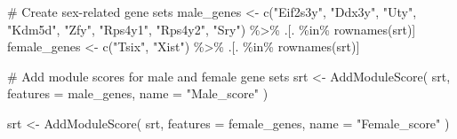 \documentclass[
  letterpaper,
  DIV=11,
  numbers=noendperiod]{scrartcl}
\newenvironment{Shaded}{\begin{snugshade}}{\end{snugshade}}
\newcommand{\AttributeTok}[1]{\textcolor[rgb]{0.40,0.45,0.13}{#1}}
\newcommand{\CommentTok}[1]{\textcolor[rgb]{0.37,0.37,0.37}{#1}}
\newcommand{\ConstantTok}[1]{\textcolor[rgb]{0.56,0.35,0.01}{#1}}
\newcommand{\DecValTok}[1]{\textcolor[rgb]{0.68,0.00,0.00}{#1}}
\newcommand{\FloatTok}[1]{\textcolor[rgb]{0.68,0.00,0.00}{#1}}
\newcommand{\FunctionTok}[1]{\textcolor[rgb]{0.28,0.35,0.67}{#1}}
\newcommand{\NormalTok}[1]{\textcolor[rgb]{0.00,0.23,0.31}{#1}}
\newcommand{\OtherTok}[1]{\textcolor[rgb]{0.00,0.23,0.31}{#1}}
\newcommand{\SpecialCharTok}[1]{\textcolor[rgb]{0.37,0.37,0.37}{#1}}
\newcommand{\StringTok}[1]{\textcolor[rgb]{0.13,0.47,0.30}{#1}}
\begin{document}
\begin{Shaded}
\begin{Highlighting}[]
\CommentTok{\# Create sex{-}related gene sets}
\NormalTok{male\_genes }\OtherTok{\textless{}{-}} \FunctionTok{c}\NormalTok{(}\StringTok{"Eif2s3y"}\NormalTok{, }\StringTok{"Ddx3y"}\NormalTok{, }\StringTok{"Uty"}\NormalTok{, }\StringTok{"Kdm5d"}\NormalTok{, }\StringTok{"Zfy"}\NormalTok{, }\StringTok{"Rps4y1"}\NormalTok{, }\StringTok{"Rps4y2"}\NormalTok{, }\StringTok{"Sry"}\NormalTok{) }\SpecialCharTok{\%\textgreater{}\%}\NormalTok{ .[. }\SpecialCharTok{\%in\%} \FunctionTok{rownames}\NormalTok{(srt)]}
\NormalTok{female\_genes }\OtherTok{\textless{}{-}} \FunctionTok{c}\NormalTok{(}\StringTok{"Tsix"}\NormalTok{, }\StringTok{"Xist"}\NormalTok{) }\SpecialCharTok{\%\textgreater{}\%}\NormalTok{ .[. }\SpecialCharTok{\%in\%} \FunctionTok{rownames}\NormalTok{(srt)]}

\CommentTok{\# Add module scores for male and female gene sets}
\NormalTok{srt }\OtherTok{\textless{}{-}} \FunctionTok{AddModuleScore}\NormalTok{(}
\NormalTok{  srt,}
  \AttributeTok{features =}\NormalTok{ male\_genes,}
  \AttributeTok{name =} \StringTok{"Male\_score"}
\NormalTok{)}

\NormalTok{srt }\OtherTok{\textless{}{-}} \FunctionTok{AddModuleScore}\NormalTok{(}
\NormalTok{  srt,}
  \AttributeTok{features =}\NormalTok{ female\_genes,}
  \AttributeTok{name =} \StringTok{"Female\_score"}
\NormalTok{)}
\end{Highlighting}
\end{Shaded}

\begin{Shaded}
\end{Shaded}
\end{document}
